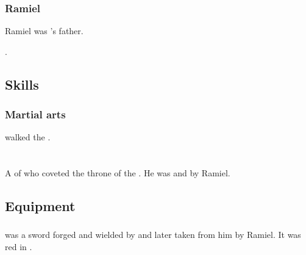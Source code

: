 \subsubsection{Ramiel}
Ramiel was \Cishiel's father. 

.








\subsection{Skills}





\subsubsection{Martial arts}
\Cishiel walked the .















\section{\Dasteron}
\index{\Dasteron}
A \ketheran{} \resphan{} of \Mystraacht{} who coveted the throne of the . 
He was  and  by Ramiel. 









\subsection{Equipment}





\subsubsection{\Scaleron}
\Scaleron{} was a  sword forged and wielded by \Dasteron{} and later taken from him by Ramiel. 
It was red in \colour. 

